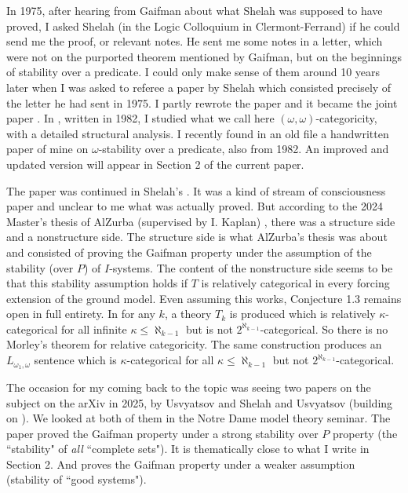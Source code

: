 \documentclass[12pt]{article}
\begin{document}
In 1975, after hearing from Gaifman about what Shelah was supposed to have proved, I asked Shelah (in the Logic Colloquium in Clermont-Ferrand) if he could send me the proof, or relevant notes. He sent me some notes in a letter,  which were not on the purported theorem mentioned by Gaifman, but on the beginnings of stability over a predicate. I could only make sense of them around 10 years later when I was asked to referee a paper by Shelah which consisted precisely of the letter he had sent in 1975.  I partly rewrote the paper and it became the joint paper \cite{Pillay-Shelah}.  In \cite{Pillay-omega-categoricity}, written in 1982,  I studied what we call here  $(\omega,\omega)$-categoricity, with a detailed structural analysis. I recently found in an old file a handwritten paper of mine on $\omega$-stability over a predicate, also from 1982.  An  improved and updated version will appear in Section 2 of the current paper. 


 The paper \cite{Pillay-Shelah} was continued in Shelah's \cite{Shelah-classification-II}.  It was a kind of stream of consciousness paper and unclear to me what was actually proved. 
But according to the 2024 Master's thesis of  AlZurba (supervised by  I. Kaplan) \cite{AlZurba}, there was a structure side and a nonstructure side. The structure side is what AlZurba's  thesis was about and consisted of proving the Gaifman property under the assumption of the stability (over $P$) of $I$-systems.  The content of the nonstructure side seems to be that this  stability assumption  holds if $T$ is relatively categorical in every forcing extension of the ground model.  Even assuming this works,  Conjecture 1.3 remains open in full entirety. 
In \cite{Hart-Shelah}  for any $k$, a theory $T_{k}$ is produced which is relatively $\kappa$-categorical for all infinite $\kappa \leq \aleph_{k-1}$ but is not $2^{\aleph_{k-1}}$-categorical.  So there is no Morley's theorem for relative categoricity. The same construction produces an $L_{\omega_{1},\omega}$ sentence which is $\kappa$-categorical for all $\kappa \leq \aleph_{k-1}$ but not $2^{\aleph_{k-1}}$-categorical.  

The occasion for my coming back to the topic was seeing two papers on the subject on the arXiv in 2025, by Usvyatsov \cite{Usvyatsov} and Shelah and Usvyatsov \cite{S-U} (building on \cite{S-U-22}).  We looked at both of them in the Notre Dame model theory seminar.  The paper \cite{Usvyatsov} proved the Gaifman property under a strong stability over $P$ property (the ``stability" of {\em all} ``complete sets").   It is thematically close to what I write in Section 2.  And \cite{S-U} proves the Gaifman property under a weaker assumption (stability of ``good systems").  
\end{document}
